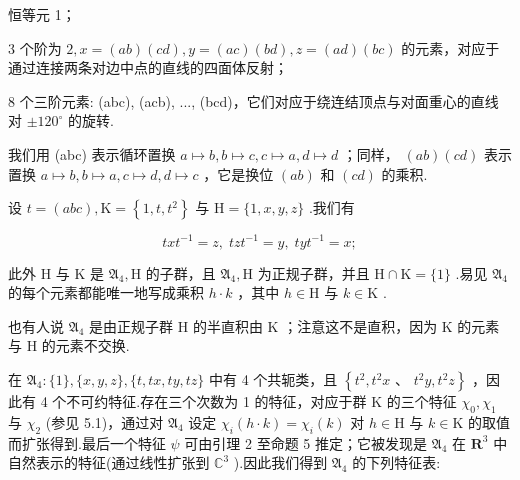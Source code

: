 \documentclass[10pt]{article}
\begin{document}
恒等元 1；

3 个阶为 \(2,x = \left( {ab}\right) \left( {cd}\right) ,y = \left( {ac}\right) \left( {bd}\right) ,z = \left( {ad}\right) \left( {bc}\right)\) 的元素，对应于通过连接两条对边中点的直线的四面体反射；

8 个三阶元素: (abc), (acb), ..., (bcd)，它们对应于绕连结顶点与对面重心的直线对 \(\pm  {120}^{ \circ  }\) 的旋转.

我们用 (abc) 表示循环置换 \(a \mapsto  b,b \mapsto  c,c \mapsto  a,d \mapsto  d\) ；同样， \(\left( {ab}\right) \left( {cd}\right)\) 表示置换 \(a \mapsto  b,b \mapsto  a,c \mapsto  d,d \mapsto  c\) ，它是换位 \(\left( {ab}\right)\) 和 \(\left( {cd}\right)\) 的乘积.

设 \(t = \left( {abc}\right) ,\mathrm{K} = \left\{  {1,t,{t}^{2}}\right\}\) 与 \(\mathrm{H} = \{ 1,x,y,z\}\) .我们有

\[
{tx}{t}^{-1} = z,\;{tz}{t}^{-1} = y,\;{ty}{t}^{-1} = x;
\]

此外 \(\mathrm{H}\) 与 \(\mathrm{K}\) 是 \({\mathfrak{A}}_{4},\mathrm{H}\) 的子群，且 \({\mathfrak{A}}_{4},\mathrm{H}\) 为正规子群，并且 \(\mathrm{H} \cap  \mathrm{K} = \{ 1\}\) .易见 \({\mathfrak{A}}_{4}\) 的每个元素都能唯一地写成乘积 \(h \cdot  k\) ，其中 \(h \in  \mathrm{H}\) 与 \(k \in  \mathrm{K}\) .

也有人说 \({\mathfrak{A}}_{4}\) 是由正规子群 \(\mathrm{H}\) 的半直积由 \(\mathrm{K}\) ；注意这不是直积，因为 K 的元素与 \(\mathrm{H}\) 的元素不交换.

在 \({\mathfrak{A}}_{4} : \{ 1\} ,\{ x,y,z\} ,\{ t,{tx},{ty},{tz}\}\) 中有 4 个共轭类，且 \(\left\{  {{t}^{2},{t}^{2}x}\right.\) 、 \(\left. {{t}^{2}y,{t}^{2}z}\right\}\) ，因此有 4 个不可约特征.存在三个次数为 1 的特征，对应于群 \(\mathrm{K}\) 的三个特征 \({\chi }_{0},{\chi }_{1}\) 与 \({\chi }_{2}\) (参见 5.1)，通过对 \({\mathfrak{A}}_{4}\) 设定 \({\chi }_{i}\left( {h \cdot  k}\right)  = {\chi }_{i}\left( k\right)\) 对 \(h \in  \mathrm{H}\) 与 \(k \in  \mathrm{K}\) 的取值而扩张得到.最后一个特征 \(\psi\) 可由引理 2 至命题 5 推定；它被发现是 \({\mathfrak{A}}_{4}\) 在 \({\mathbf{R}}^{3}\) 中自然表示的特征(通过线性扩张到 \({\mathbb{C}}^{3}\) ).因此我们得到 \({\mathfrak{A}}_{4}\) 的下列特征表:

\begin{center}
\end{center}
\end{document}
